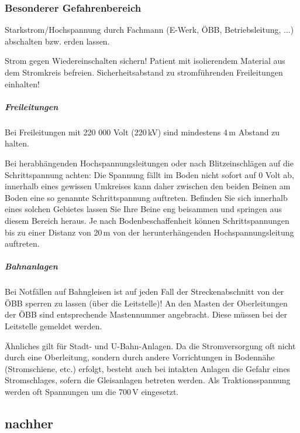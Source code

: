 \documentclass[ngerman,paper=a4,fontsize=8pt,headings=small,draft=no,parskip=half,noonelinecaption]{scrreprt}
\begin{document}


\subsubsection{Besonderer Gefahrenbereich}
\label{topic:gefahrenbereich-strom}
Starkstrom/Hochspannung durch Fachmann (E-Werk, ÖBB,
Betriebsleitung, ...) abschalten bzw. erden lassen. 

Strom
gegen Wiedereinschalten sichern! Patient mit isolierendem
Material aus dem Stromkreis befreien. Sicherheitsabstand zu
stromführenden Freileitungen einhalten! 

\subparagraph{Freileitungen}


Bei Freileitungen mit
220 000 Volt (220\,kV) sind mindestens 4\,m Abstand zu halten.
\cite{Jaros1} 

Bei herabhängenden Hochspannungsleitungen oder
nach Blitzeinschlägen auf die Schrittspannung achten: Die
Spannung fällt im Boden nicht sofort auf 0 Volt ab, innerhalb
eines gewissen Umkreises kann daher zwischen den beiden
Beinen am Boden eine so genannte Schrittspannung auftreten.
Befinden Sie sich innerhalb eines solchen Gebietes lassen Sie
Ihre Beine eng beisammen und springen aus diesem Bereich
heraus. Je nach Bodenbeschaffenheit können Schrittspannungen
bis zu einer Distanz von 20\,m von der herunterhängenden
Hochspannungsleitung auftreten. \cite{RedelsteinerHRNS1} 

\subparagraph{Bahnanlagen}
Bei
Notfällen auf Bahngleisen ist auf jeden Fall der
Streckenabschnitt von der ÖBB sperren zu lassen (über die
Leitstelle)! An den Masten der Oberleitungen der ÖBB sind
entsprechende Mastennummer angebracht. Diese müssen bei der Leitstelle gemeldet
werden. 

Ähnliches gilt für Stadt- und U-Bahn-Anlagen. Da die Stromversorgung oft nicht
durch eine Oberleitung, sondern durch andere Vorrichtungen in
Bodennähe (Stromschiene, etc.) erfolgt, besteht auch bei intakten Anlagen die
Gefahr eines Stromschlages, sofern die Gleisanlagen betreten werden. Als
Traktionsspannung werden oft Spannungen um die 700\,V eingesetzt. \cite{U61989}
 
\subsection{nachher}
\end{document}
